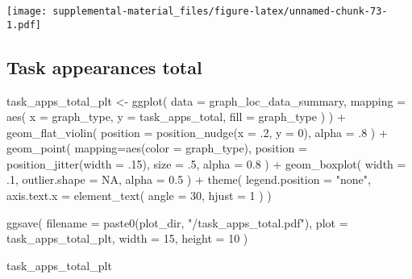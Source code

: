 \documentclass[
]{book}
\newenvironment{Shaded}{\begin{snugshade}}{\end{snugshade}}
\newcommand{\AttributeTok}[1]{\textcolor[rgb]{0.77,0.63,0.00}{#1}}
\newcommand{\ConstantTok}[1]{\textcolor[rgb]{0.00,0.00,0.00}{#1}}
\newcommand{\DecValTok}[1]{\textcolor[rgb]{0.00,0.00,0.81}{#1}}
\newcommand{\FloatTok}[1]{\textcolor[rgb]{0.00,0.00,0.81}{#1}}
\newcommand{\FunctionTok}[1]{\textcolor[rgb]{0.00,0.00,0.00}{#1}}
\newcommand{\NormalTok}[1]{#1}
\newcommand{\OtherTok}[1]{\textcolor[rgb]{0.56,0.35,0.01}{#1}}
\newcommand{\SpecialCharTok}[1]{\textcolor[rgb]{0.00,0.00,0.00}{#1}}
\newcommand{\StringTok}[1]{\textcolor[rgb]{0.31,0.60,0.02}{#1}}
\begin{document}
\texttt{[image: supplemental-material\_files/figure-latex/unnamed-chunk-73-1.pdf]}

\hypertarget{task-appearances-total}{%
\subsection{Task appearances total}\label{task-appearances-total}}

\begin{Shaded}
\begin{Highlighting}[]
\NormalTok{task\_apps\_total\_plt }\OtherTok{\textless{}{-}} \FunctionTok{ggplot}\NormalTok{(}
    \AttributeTok{data =}\NormalTok{ graph\_loc\_data\_summary,}
    \AttributeTok{mapping =} \FunctionTok{aes}\NormalTok{(}
      \AttributeTok{x =}\NormalTok{ graph\_type,}
      \AttributeTok{y =}\NormalTok{ task\_apps\_total,}
      \AttributeTok{fill =}\NormalTok{ graph\_type}
\NormalTok{    )}
\NormalTok{  ) }\SpecialCharTok{+}
  \FunctionTok{geom\_flat\_violin}\NormalTok{(}
    \AttributeTok{position =} \FunctionTok{position\_nudge}\NormalTok{(}\AttributeTok{x =}\NormalTok{ .}\DecValTok{2}\NormalTok{, }\AttributeTok{y =} \DecValTok{0}\NormalTok{),}
    \AttributeTok{alpha =}\NormalTok{ .}\DecValTok{8}
\NormalTok{  ) }\SpecialCharTok{+}
  \FunctionTok{geom\_point}\NormalTok{(}
    \AttributeTok{mapping=}\FunctionTok{aes}\NormalTok{(}\AttributeTok{color =}\NormalTok{ graph\_type),}
    \AttributeTok{position =} \FunctionTok{position\_jitter}\NormalTok{(}\AttributeTok{width =}\NormalTok{ .}\DecValTok{15}\NormalTok{),}
    \AttributeTok{size =}\NormalTok{ .}\DecValTok{5}\NormalTok{,}
    \AttributeTok{alpha =} \FloatTok{0.8}
\NormalTok{  ) }\SpecialCharTok{+}
  \FunctionTok{geom\_boxplot}\NormalTok{(}
    \AttributeTok{width =}\NormalTok{ .}\DecValTok{1}\NormalTok{,}
    \AttributeTok{outlier.shape =} \ConstantTok{NA}\NormalTok{,}
    \AttributeTok{alpha =} \FloatTok{0.5}
\NormalTok{  ) }\SpecialCharTok{+}
  \FunctionTok{theme}\NormalTok{(}
    \AttributeTok{legend.position =} \StringTok{"none"}\NormalTok{,}
    \AttributeTok{axis.text.x =} \FunctionTok{element\_text}\NormalTok{(}
      \AttributeTok{angle =} \DecValTok{30}\NormalTok{,}
      \AttributeTok{hjust =} \DecValTok{1}
\NormalTok{    )}
\NormalTok{  )}

\FunctionTok{ggsave}\NormalTok{(}
  \AttributeTok{filename =} \FunctionTok{paste0}\NormalTok{(plot\_dir, }\StringTok{"/task\_apps\_total.pdf"}\NormalTok{),}
  \AttributeTok{plot =}\NormalTok{ task\_apps\_total\_plt,}
  \AttributeTok{width =} \DecValTok{15}\NormalTok{,}
  \AttributeTok{height =} \DecValTok{10}
\NormalTok{)}

\NormalTok{task\_apps\_total\_plt}
\end{Highlighting}
\end{Shaded}
\end{document}
